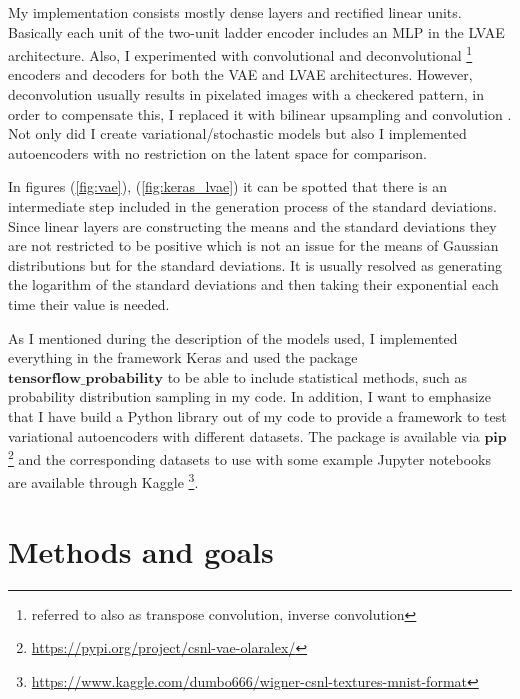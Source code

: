 \documentclass[12pt, english]{article}
\begin{document}
\vspace{4mm}

\par My implementation consists mostly dense layers and rectified linear units. Basically each unit of the two-unit ladder encoder includes an MLP in the LVAE architecture. Also, I experimented with convolutional and deconvolutional \footnote{referred to also as transpose convolution, inverse convolution} encoders and decoders for both the VAE and LVAE architectures. However, deconvolution usually results in pixelated images with a checkered pattern, in order to compensate this, I replaced it with bilinear upsampling and convolution \cite{odena2016deconvolution}. Not only did I create variational/stochastic models but also I implemented autoencoders with no restriction on the latent space for comparison.

\vspace{4mm}

\par In figures (\ref{fig:vae}), (\ref{fig:keras_lvae}) it can be spotted that there is an intermediate step included in the generation process of the standard deviations. Since linear layers are constructing the means and the standard deviations they are not restricted to be positive which is not an issue for the means of Gaussian distributions but for the standard deviations. It is usually resolved as generating the logarithm of the standard deviations and then taking their exponential each time their value is needed.

\vspace{4mm}

\par As I mentioned during the description of the models used, I implemented everything in the framework Keras and used the package $\bm{tensorflow\_probability}$ to be able to include statistical methods, such as probability distribution sampling in my code. In addition, I want to emphasize that I have build a Python library out of my code to provide a framework to test variational autoencoders with different datasets. The package is available via $\bm{pip}$ \footnote{\url{https://pypi.org/project/csnl-vae-olaralex/}} and the corresponding datasets to use with some example Jupyter notebooks are available through Kaggle \footnote{\url{https://www.kaggle.com/dumbo666/wigner-csnl-textures-mnist-format}}.

\newpage

\section{Methods and goals}
\end{document}
